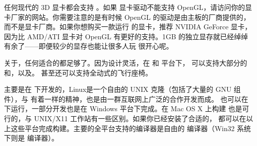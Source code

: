 任何现代的 3D 显卡都会支持 。如果  显卡驱动不能支持 OpenGL，请访问你的显卡厂家的网站。你需要注意的是有时候 OpenGL 的驱动是由主板的厂商提供的，而不是显卡厂商。如果你想购买一款运行 \FlightGear{} 的显卡，推荐 NVIDIA GeForce 显卡，因为比 AMD/ATI 显卡对 OpenGL 有更好的支持。1GB 的独立显存就已经绰绰有余了——即便较少的显存也能让很多人玩 \FlightGear{} 很开心呢。

关于，任何适合的都足够了。因为设计灵活，在  和  平台下，\FlightGear{} 可以支持大部分的和，以及。\FlightGear{} 甚至还可以支持全动式的飞行座椅。

\FlightGear{} 主要是在  下开发的，Linux是一个自由的 UNIX 克隆（包括了大量的 GNU 组件），与\FlightGear{} 有着一样的精神，也是由一群互联网上广泛的合作开发而成。\FlightGear{} 也可以在  下运行，一部分开发也是在 Windows 平台下完成。在 Mac OS X 上构建 \FlightGear{} 也是可行的，与 UNIX/X11 工作站有一些区别。如果你已经安装了合适的，\FlightGear{} 都可以在以上这些平台完成构建。主要的全平台支持的编译器是自由的  编译器（Win32 系统下则是   编译器）。

